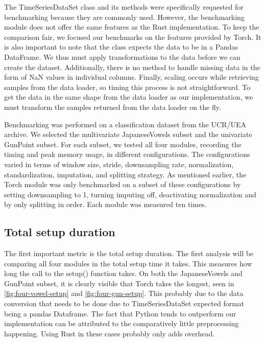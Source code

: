 \documentclass[review]{AIM_report}
\begin{document}
The TimeSeriesDataSet class and its methods were specifically requested for benchmarking because they are commonly used. However, the benchmarking module does not offer the same features as the Rust implementation. To keep the comparison fair, we focused our benchmarks on the features provided by Torch. It is also important to note that the class expects the data to be in a Pandas DataFrame. We thus must apply transformations to the data before we can create the dataset. Additionally, there is no method to handle missing data in the form of NaN values in individual columns. Finally, scaling occurs while retrieving samples from the data loader, so timing this process is not straightforward. To get the data in the same shape from the data loader as our implementation, we must transform the samples returned from the data loader on the fly.

Benchmarking was performed on a classification dataset from the UCR/UEA archive. We selected the multivariate JapaneseVowels subset and the univariate GunPoint subset. For each subset, we tested all four modules, recording the timing and peak memory usage, in different configurations. The configurations varied in terms of window size, stride, downsampling rate, normalization, standardization, imputation, and splitting strategy. As mentioned earlier, the Torch module was only benchmarked on a subset of these configurations by setting downsampling to 1, turning imputing off, deactivating normalization and by only splitting in order. Each module was measured ten times.

\subsection{Total setup duration}
The first important metric is the total setup duration. The first analysis will be comparing all four modules in the total setup time it takes. This measures how long the call to the setup() function takes. On both the JapaneseVowels and GunPoint subset, it is clearly visible that Torch takes the longest, seen in \autoref{fig:four-vowel-setup} and \autoref{fig:four-gun-setup}. This probably due to the data conversion that needs to be done due to TimeSeriesDataSet expected format being a pandas Dataframe. The fact that Python tends to outperform our implementation can be attributed to the comparatively little preprocessing happening. Using Rust in these cases probably only adds overhead.
\end{document}
